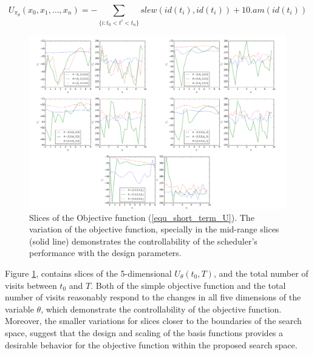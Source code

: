\documentclass[12pt,aas_macros]{article}
\theoremstyle{definition}
\begin{document}
\begin{equation}\label{equ_short_term_U}
U_{\pi_{\theta}}(x_0,x_{1}, \dots, x_{n})= -\sum_{\{i:t_0<t^i<t_n\}} {slew(id(t_{i}), id(t_i)) + 10 . am(id(t_i))}
\end{equation}

\begin{figure}[h!]
\begin{center}
\includegraphics[width=1\linewidth]{Controlability.png}
\end{center}
\caption{Slices of the Objective function (\ref{equ_short_term_U}). The variation of the objective function, specially in the mid-range slices (solid line) demonstrates the controllability of the scheduler's performance with the design parameters.}
\label{fig_controlability}
\end{figure}

Figure \ref{fig_controlability}, contains slices of the 5-dimensional $U_{\theta }(t_0, T)$, and the total number of visits between $t_0$ and $T$. Both of the simple objective function and the total number of visits reasonably respond to the changes in all five dimensions of the variable $\theta$, which demonstrate the controllability of the objective function. Moreover, the smaller variations for slices closer to the boundaries of the search space, suggest that the design and scaling of the basis functions provides a desirable behavior for the objective function within the proposed search space.
\end{document}
